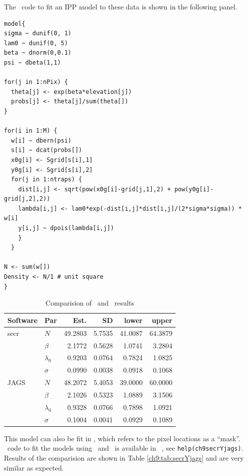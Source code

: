 The \bugs~code to fit an IPP model to these data is shown in
the following panel.

\begin{small}
\begin{verbatim}
model{
sigma ~ dunif(0, 1)
lam0 ~ dunif(0, 5)
beta ~ dnorm(0,0.1)
psi ~ dbeta(1,1)

for(j in 1:nPix) {
  theta[j] <- exp(beta*elevation[j])
  probs[j] <- theta[j]/sum(theta[])
}

for(i in 1:M) {
  w[i] ~ dbern(psi)
  s[i] ~ dcat(probs[])
  x0g[i] <- Sgrid[s[i],1]
  y0g[i] <- Sgrid[s[i],2]
  for(j in 1:ntraps) {
    dist[i,j] <- sqrt(pow(x0g[i]-grid[j,1],2) + pow(y0g[i]-grid[j,2],2))
    lambda[i,j] <- lam0*exp(-dist[i,j]*dist[i,j]/(2*sigma*sigma)) * w[i]
    y[i,j] ~ dpois(lambda[i,j])
    }
  }

N <- sum(w[])
Density <- N/1 # unit square
}
\end{verbatim}
\end{small}


\begin{table}[b]
\centering
\caption{Comparision of \secr~and \jags~results}
\begin{tabular}{llrrrr}
\hline
Software & Par & Est. & SD & lower & upper \\
\hline
 secr & $N$ & 49.2803 & 5.7535 & 41.0087 & 64.3879 \\
      & $\beta$ &  2.1772 & 0.5628 &  1.0741 &  3.2804 \\
      & $\lambda_0$ &  0.9203 & 0.0764 &  0.7824 &  1.0825 \\
      & $\sigma$ &  0.0990 & 0.0038 &  0.0918 &  0.1068 \\
 JAGS & $N$ & 48.2072 & 5.4053 & 39.0000 & 60.0000 \\
      & $\beta$ &  2.1026 & 0.5323 &  1.0889 &  3.1506 \\
      & $\lambda_0$ &  0.9328 & 0.0766 &  0.7898 &  1.0921 \\
      & $\sigma$ &  0.1004 & 0.0041 &  0.0929 &  0.1089 \\
\hline
\end{tabular}
\label{ch9:tab:simIPP}
\end{table}


This model can also be fit in \secr, which refers
to the pixel locations as a ``mask''. \R~code to
fit the models using \secr~and \jags~is available in \scrbook~, see
\verb#help(ch9secrYjags)#. Results of the
comparision are shown in Table \ref{ch9:tab:secrYjags} and are
very similar as expected.


